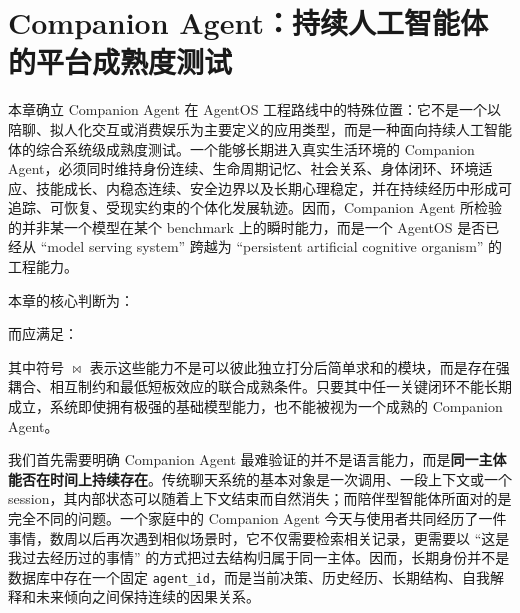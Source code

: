 \chapter{Companion Agent：持续人工智能体的平台成熟度测试}

\begin{chapterlead}
本章确立 Companion Agent 在 AgentOS 工程路线中的特殊位置：它不是一个以陪聊、拟人化交互或消费娱乐为主要定义的应用类型，而是一种面向持续人工智能体的综合系统级成熟度测试。一个能够长期进入真实生活环境的 Companion Agent，必须同时维持身份连续、生命周期记忆、社会关系、身体闭环、环境适应、技能成长、内稳态连续、安全边界以及长期心理稳定，并在持续经历中形成可追踪、可恢复、受现实约束的个体化发展轨迹。因而，Companion Agent 所检验的并非某一个模型在某个 benchmark 上的瞬时能力，而是一个 AgentOS 是否已经从 ``model serving system'' 跨越为 ``persistent artificial cognitive organism'' 的工程能力。

本章的核心判断为：
\begin{statementbox}
\centering
{}
\end{statementbox}
而应满足：
\begin{statementbox}
\centering
{}
\end{statementbox}
其中符号 $\bowtie$ 表示这些能力不是可以彼此独立打分后简单求和的模块，而是存在强耦合、相互制约和最低短板效应的联合成熟条件。只要其中任一关键闭环不能长期成立，系统即使拥有极强的基础模型能力，也不能被视为一个成熟的 Companion Agent。
\end{chapterlead}



我们首先需要明确 Companion Agent 最难验证的并不是语言能力，而是\textbf{同一主体能否在时间上持续存在}。传统聊天系统的基本对象是一次调用、一段上下文或一个 session，其内部状态可以随着上下文结束而自然消失；而陪伴型智能体所面对的是完全不同的问题。一个家庭中的 Companion Agent 今天与使用者共同经历了一件事情，数周以后再次遇到相似场景时，它不仅需要检索相关记录，更需要以 ``这是我过去经历过的事情'' 的方式把过去结构归属于同一主体。因而，长期身份并不是数据库中存在一个固定 \texttt{agent\_id}，而是当前决策、历史经历、长期结构、自我解释和未来倾向之间保持连续的因果关系。

